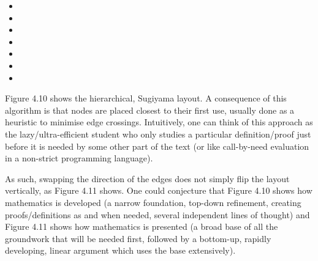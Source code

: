 \begin{itemize}
  \item {}
  \item {}
  \item {}
  \item {}
  \item {}
  \item {}
  \item {}
\end{itemize}


Figure 4.10 shows the hierarchical, Sugiyama layout. A consequence of this
algorithm is that nodes are placed closest to their first use, usually done as a
heuristic to minimise edge crossings. Intuitively, one can think of this
approach as the lazy/ultra-efficient student who only studies a particular
definition/proof just before it is needed by some other part of the text (or
like call-by-need evaluation in a non-strict programming language).

As such, swapping the direction of the edges does not simply flip the layout
vertically, as Figure 4.11 shows. One could conjecture that Figure 4.10 shows
how mathematics is developed (a narrow foundation, top-down refinement, creating
proofs/definitions as and when needed, several independent lines of thought) and
Figure 4.11 shows how mathematics is presented (a broad base of all the
groundwork that will be needed first, followed by a bottom-up, rapidly
developing, linear argument which uses the base extensively).


